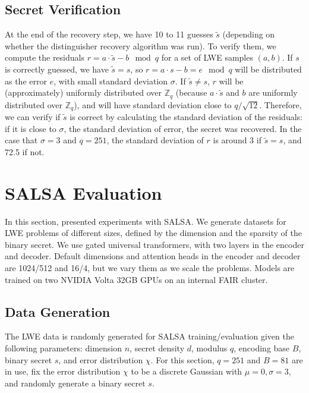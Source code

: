 \documentclass{article}
\begin{document}
\subsection{Secret Verification}

At the end of the recovery step, we have 10 to 11 guesses \( \tilde{s} \) (depending on whether the distinguisher recovery algorithm was run). To verify them, we compute the residuals \( r = a \cdot \tilde{s} - b \mod q \) for a set of LWE samples \( (a, b) \). If \( s \) is correctly guessed, we have \( \tilde{s} = s \), so \( r = a \cdot s - b = e \mod q \) will be distributed as the error \( e \), with small standard deviation \( \sigma \). If \( \tilde{s} \neq s \), \( r \) will be (approximately) uniformly distributed over \( \mathbb{Z}_q \) (because \( a \cdot \tilde{s} \) and \( b \) are uniformly distributed over \( \mathbb{Z}_q \)), and will have standard deviation close to \( q / \sqrt{12} \). Therefore, we can verify if \( \tilde{s} \) is correct by calculating the standard deviation of the residuals: if it is close to \( \sigma \), the standard deviation of error, the secret was recovered. In the case that \( \sigma = 3 \) and \( q = 251 \), the standard deviation of \( r \) is around 3 if \( \tilde{s} = s \), and 72.5 if not.

\section{SALSA Evaluation}

In this section, presented experiments with SALSA. We generate datasets for LWE problems of different sizes, defined by the dimension and the sparsity of the binary secret. We use gated universal transformers, with two layers in the encoder and decoder. Default dimensions and attention heads in the encoder and decoder are 1024/512 and 16/4, but we vary them as we scale the problems. Models are trained on two NVIDIA Volta 32GB GPUs on an internal FAIR cluster.

\subsection{Data Generation}

The LWE data is randomly generated for SALSA training/evaluation given the following parameters: dimension \( n \), secret density \( d \), modulus \( q \), encoding base \( B \), binary secret \( s \), and error distribution \( \chi \). For this section, \( q = 251 \) and \( B = 81 \) are in use, fix the error distribution \( \chi \) to be a discrete Gaussian with \( \mu = 0, \sigma = 3 \), and randomly generate a binary secret \( s \).
\end{document}
